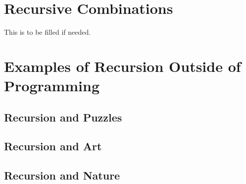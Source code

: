 


\section{Recursive Combinations}
This is to be filled if needed.



\section{Examples of Recursion Outside of Programming}
\subsection{Recursion and Puzzles}



\subsection{Recursion and Art}

\subsection{Recursion and Nature}
